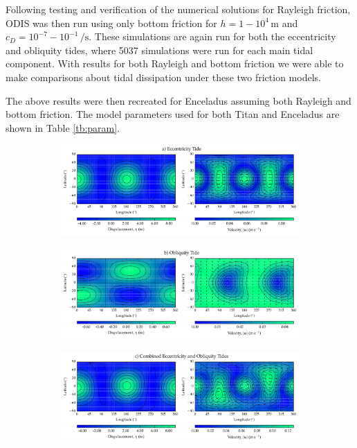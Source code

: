 Following testing and verification of the numerical solutions for Rayleigh friction, ODIS was then run using only bottom friction for \hbox{$h = 1 - 10^4 \, \si{\metre}$} and \hbox{$c_D = 10^{-7} - 10^{-1} \, \si{\per\second}$}. These simulations are again run for both the eccentricity and obliquity tides, where 5037 simulations were run for each main tidal component. With results for both Rayleigh and bottom friction we were able to make comparisons about tidal dissipation under these two friction models.

The above results were then recreated for Enceladus assuming both Rayleigh and bottom friction. The model parameters used for both Titan and Enceladus are shown in Table \ref{tb:param}.



\begin{figure}[!t]
\begin{subfigure}{\linewidth}
\centering
\includegraphics[width=0.9\linewidth,trim={0 0 0 0.2cm},clip]{Figures/Ecc_test}
\subcaption{\label{fig:LTE_a}}
\end{subfigure}\vspace*{-0.7cm}
\begin{subfigure}{\linewidth}
\centering
\includegraphics[width=0.9\linewidth]{Figures/Obliq_test}
\subcaption{\label{fig:LTE_b}}
\end{subfigure}\vspace*{-0.7cm}
\begin{subfigure}{\linewidth}
\centering
\includegraphics[width=0.9\linewidth]{Figures/Full_test}

\end{subfigure}
\end{figure}
